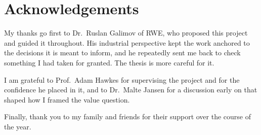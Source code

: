 \section*{Acknowledgements}

My thanks go first to Dr.\ Ruslan Galimov of RWE, who proposed this project and
guided it throughout. His industrial perspective kept the work anchored to the
decisions it is meant to inform, and he repeatedly sent me back to check
something I had taken for granted. The thesis is more careful for it.

I am grateful to Prof.\ Adam Hawkes for supervising the project and for the
confidence he placed in it, and to Dr.\ Malte Jansen for a discussion early on
that shaped how I framed the value question.

Finally, thank you to my family and friends for their support over the course
of the year.